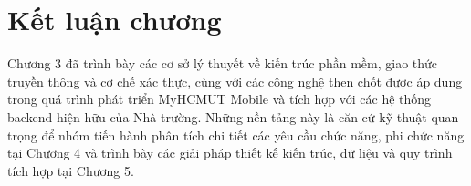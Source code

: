\section{Kết luận chương}
\label{sec:ketluan_chuong3}

Chương 3 đã trình bày các cơ sở lý thuyết về kiến trúc phần mềm, giao thức truyền thông và cơ chế xác thực, cùng với các công nghệ then chốt được áp dụng trong quá trình phát triển MyHCMUT Mobile và tích hợp với các hệ thống backend hiện hữu của Nhà trường. Những nền tảng này là căn cứ kỹ thuật quan trọng để nhóm tiến hành phân tích chi tiết các yêu cầu chức năng, phi chức năng tại Chương 4 và trình bày các giải pháp thiết kế kiến trúc, dữ liệu và quy trình tích hợp tại Chương 5.
